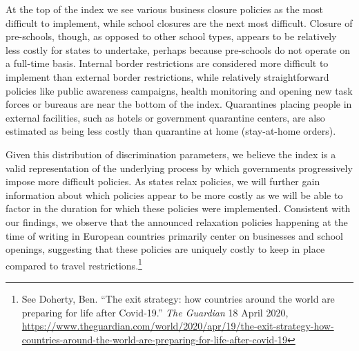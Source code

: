 \documentclass[
]{article}
\begin{document}
At the top of the index we see various business closure policies as the most difficult to implement, while school closures are the next most difficult. Closure of pre-schools, though, as opposed to other school types, appears to be relatively less costly for states to undertake, perhaps because pre-schools do not operate on a full-time basis. Internal border restrictions are considered more difficult to implement than external border restrictions, while relatively straightforward policies like public awareness campaigns, health monitoring and opening new task forces or bureaus are near the bottom of the index. Quarantines placing people in external facilities, such as hotels or government quarantine centers, are also estimated as being less costly than quarantine at home (stay-at-home orders).

Given this distribution of discrimination parameters, we believe the index is a valid representation of the underlying process by which governments progressively impose more difficult policies. As states relax policies, we will further gain information about which policies appear to be more costly as we will be able to factor in the duration for which these policies were implemented. Consistent with our findings, we observe that the announced relaxation policies happening at the time of writing in European countries primarily center on businesses and school openings, suggesting that these policies are uniquely costly to keep in place compared to travel restrictions.\footnote{See Doherty, Ben. ``The exit strategy: how countries around the world are preparing for life after Covid-19.'' \emph{The Guardian} 18 April 2020, \url{https://www.theguardian.com/world/2020/apr/19/the-exit-strategy-how-countries-around-the-world-are-preparing-for-life-after-covid-19}}

\begingroup\fontsize{9}{11}\selectfont
\end{document}
